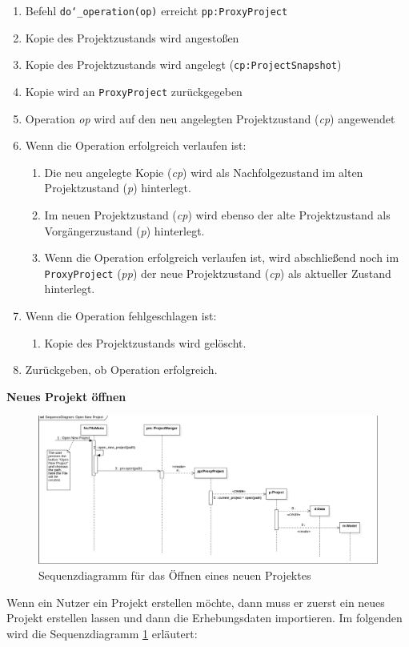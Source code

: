 \documentclass{article}
\begin{document}
\begin{enumerate}
    \item[1.] Befehl \texttt{do\char`_operation(op)} erreicht \texttt{pp:ProxyProject}
    \item[2.] Kopie des Projektzustands wird angestoßen
    \item[3.] Kopie des Projektzustands wird angelegt (\texttt{cp:ProjectSnapshot})
    \item[4.] Kopie wird an \texttt{ProxyProject} zurückgegeben
    \item[4.5.] Operation \emph{op} wird auf den neu angelegten Projektzustand (\emph{cp}) angewendet
    \item[] Wenn die Operation erfolgreich verlaufen ist:
    \begin{enumerate}
        \item[5.] Die neu angelegte Kopie (\emph{cp}) wird als Nachfolgezustand im alten Projektzustand (\emph{p}) hinterlegt.
        \item[7.] Im neuen Projektzustand (\emph{cp}) wird ebenso der alte Projektzustand als Vorgängerzustand (\emph{p}) hinterlegt.
        \item[9.] Wenn die Operation erfolgreich verlaufen ist, wird abschließend noch im \texttt{ProxyProject} (\emph{pp}) der neue Projektzustand (\emph{cp}) als aktueller Zustand hinterlegt.
    \end{enumerate}
    \item[] Wenn die Operation fehlgeschlagen ist:
    \begin{enumerate}
        \item[11.] Kopie des Projektzustands wird gelöscht.
    \end{enumerate}
    \item[12.] Zurückgeben, ob Operation erfolgreich.
    
\end{enumerate}

\textbf{\large{Neues Projekt öffnen}}
\begin{figure}[H]%
    \includegraphics[width=15cm]{entwurf/Entwurf_dokument/img/Alissa/SQOpenNewProject3.png}
    \caption{Sequenzdiagramm für das Öffnen eines neuen Projektes}
    \label{fig:sq:openNewProject}
\end{figure}
Wenn ein Nutzer ein Projekt erstellen möchte, dann muss er zuerst ein neues Projekt erstellen lassen und dann die Erhebungsdaten importieren. Im folgenden wird die Sequenzdiagramm \ref{fig:sq:openNewProject} erläutert:
\end{document}
